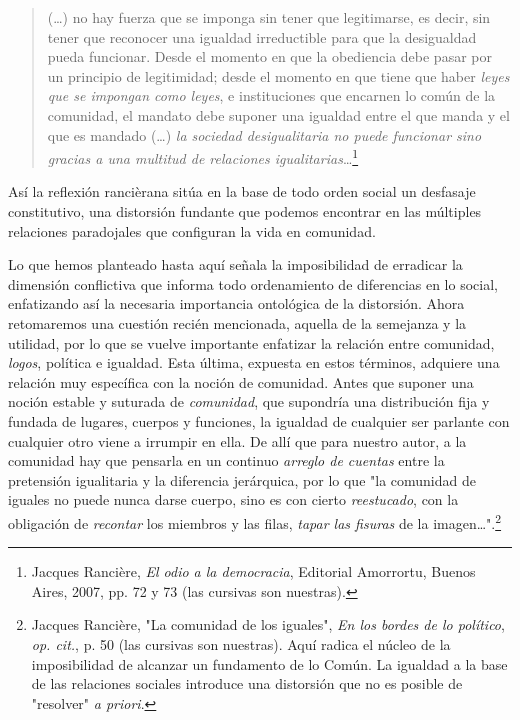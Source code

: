 \begin{quote}
(\dots) no hay fuerza que se imponga sin tener que legitimarse, es
decir, sin tener que reconocer una igualdad irreductible para que la
desigualdad pueda funcionar. Desde el momento en que la obediencia debe
pasar por un principio de legitimidad; desde el momento en que tiene que
haber \emph{leyes que se impongan como leyes}, e instituciones que
encarnen lo común de la comunidad, el mandato debe suponer una igualdad
entre el que manda y el que es mandado (\dots) \emph{la sociedad
desigualitaria no puede funcionar sino gracias a una multitud de
relaciones igualitarias}\ldots{}\footnote{Jacques Rancière, \emph{El
  odio a la democracia}, Editorial Amorrortu, Buenos Aires, 2007, pp. 72
  y 73 (las cursivas son nuestras).}
\end{quote}

Así la reflexión rancièrana sitúa en la base de todo orden social un
desfasaje constitutivo, una distorsión fundante que podemos encontrar en
las múltiples relaciones paradojales que configuran la vida en
comunidad.

Lo que hemos planteado hasta aquí señala la imposibilidad de erradicar
la dimensión conflictiva que informa todo ordenamiento de diferencias en
lo social, enfatizando así la necesaria importancia ontológica de la
distorsión. Ahora retomaremos una cuestión recién mencionada, aquella de
la semejanza y la utilidad, por lo que se vuelve importante enfatizar la
relación entre comunidad, \emph{logos}, política e igualdad. Esta
última, expuesta en estos términos, adquiere una relación muy específica
con la noción de comunidad. Antes que suponer una noción estable y
suturada de \emph{comunidad}, que supondría una distribución fija y
fundada de lugares, cuerpos y funciones, la igualdad de cualquier ser
parlante con cualquier otro viene a irrumpir en ella. De allí que para
nuestro autor, a la comunidad hay que pensarla en un continuo
\emph{arreglo de cuentas} entre la pretensión igualitaria y la
diferencia jerárquica, por lo que "la comunidad de iguales no puede
nunca darse cuerpo, sino es con cierto \emph{reestucado}, con la
obligación de \emph{recontar} los miembros y las filas, \emph{tapar las
fisuras} de la imagen\ldots".\footnote{Jacques Rancière, "La comunidad
  de los iguales", \emph{En los bordes de lo político}, \emph{op. cit.},
  p. 50 (las cursivas son nuestras). Aquí radica el núcleo de la
  imposibilidad de alcanzar un fundamento de lo Común. La igualdad a la
  base de las relaciones sociales introduce una distorsión que no es
  posible de "resolver" \emph{a priori}.}

